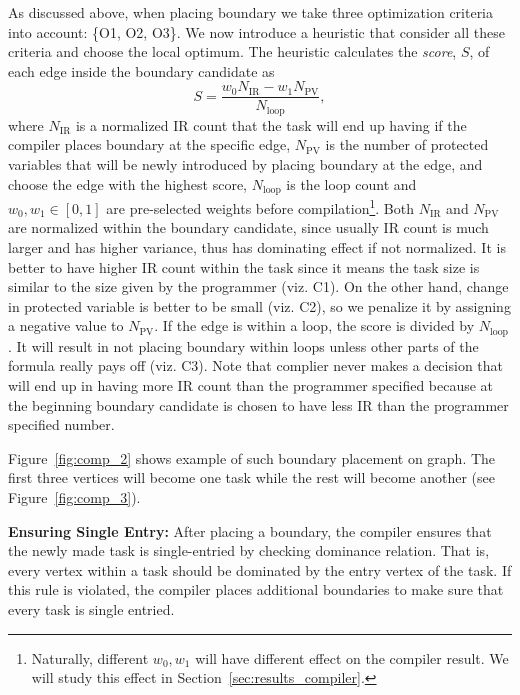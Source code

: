 As discussed above, when placing boundary we take three optimization criteria into account: \{O1, O2, O3\}. We now introduce a heuristic that consider all these criteria and choose the local optimum. The heuristic calculates the {\em score}, $S$, of each edge inside the boundary candidate as
%
\begin{equation}
S = \frac{w_{0} N_{\text{IR}} - w_{1} N_{\text{PV}}}{N_{\text{loop}}},\nonumber
\end{equation}
%
where $N_{\text{IR}}$ is a normalized IR count that the task will end up having if the compiler places boundary at the specific edge, $N_{\text{PV}}$ is the number of protected variables that will be newly introduced by placing boundary at the edge, and choose the edge with the highest score, $N_{\text{loop}}$ is the loop count and $w_{0},w_{1}\in [0,1]$ are pre-selected weights before compilation\footnote{Naturally, different $w_{0}, w_{1}$ will have different effect on the compiler result. We will study this effect in Section~\ref{sec:results_compiler}.}. Both $N_{\text{IR}}$ and $N_{\text{PV}}$ are normalized within the boundary candidate, since usually IR count is much larger and has higher variance, thus has dominating effect if not normalized. It is better to have higher IR count within the task since it means the task size is similar to the size given by the programmer (viz. C1). On the other hand, change in protected variable is better to be small (viz. C2), so we penalize it by assigning a negative value to $N_{\text{PV}}$. If the edge is within a loop, the score is divided by $N_{\text{loop}}$. It will result in not placing boundary within loops unless other parts of the formula really pays off (viz. C3). Note that complier never makes a decision that will end up in having more IR count than the programmer specified because at the beginning boundary candidate is chosen to have less IR than the programmer specified number.

Figure~\ref{fig:comp_2} shows example of such boundary placement on graph. The first three vertices will become one task while the rest will become another (see Figure~\ref{fig:comp_3}).

\textbf{Ensuring Single Entry:} After placing a boundary, the compiler ensures that the newly made task is single-entried by checking dominance relation. That is, every vertex within a task should be dominated by the entry vertex of the task. If this rule is violated, the compiler places additional boundaries to make sure that every task is single entried.

